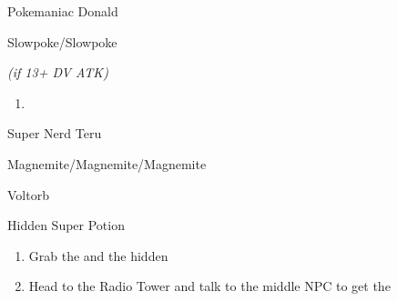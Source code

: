 \begin{paracol}{2}
\begin{trainer}{Pokemaniac Donald}
	\varwb
	\begin{notes}
		\small{\item {}}
		\begin{notes}
			\small{\item {}}
		\end{notes}
	\end{notes}
	\begin{fightSection}{Slowpoke/Slowpoke}
		\item {} \bite{} \trainerHlTwo{2x}
		\begin{notes}
			\small{\item {} \headbutt{}  \textit{(if 13+ DV ATK)}}
		\end{notes}
	\end{fightSection}
	\varwe
\end{trainer}

\resume
\begin{enumerate}[resume]
	\item {}
\end{enumerate}

\begin{trainer}{Super Nerd Teru}
	\varwb
	\begin{fightSection}{Magnemite/Magnemite/Magnemite}
		\item {} \waterGun{} 
	\end{fightSection}
	\begin{fightSection}{Voltorb}
		\item {} \headbutt
	\end{fightSection}
	\varwe
\end{trainer}

\switchcolumn*
\alignBoxes
\begin{items}{Hidden Super Potion}
	\varwb
	\varwe
\end{items}

\switchcolumn
\begin{enumerate}[resume]
	\item Grab the  and the hidden 
	\item Head to the Radio Tower and talk to the middle NPC to get the 
\end{enumerate}


\end{paracol}
